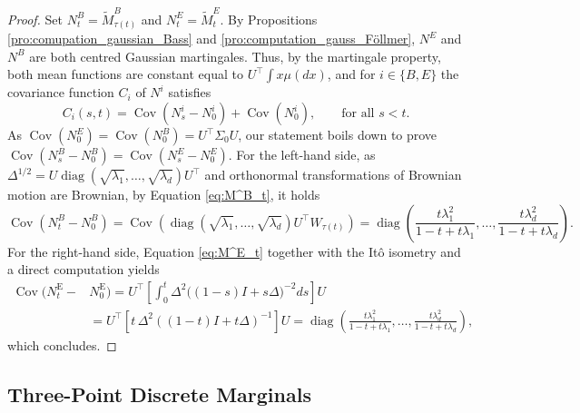\documentclass[reqno, a4paper]{amsart}
\theoremstyle{plain}
\theoremstyle{definition}
\theoremstyle{remark}
\numberwithin{equation}{section}
\numberwithin{theorem}{section}
\DeclareMathOperator{\diag}{diag}
\DeclareMathOperator{\Cov}{Cov}
\begin{document}
	\begin{proof}
		Set $N_t^B= \tilde M_{\tau(t)}^B$ and
		$N_t^E= \tilde M_t^E$. By Propositions \ref{pro:comupation_gaussian_Bass} and \ref{pro:computation_gauss_Föllmer}, $N^E$ and $N^B$ are both centred Gaussian martingales. Thus, by the martingale property, both mean functions are constant 
        equal to $U^\top \int x \mu(dx)$, and for $i \in \{ B,E \}$ the covariance function $C_i$ of $N^i$ satisfies
        $$C_i(s,t) = \Cov(N_s^i - N_0^i) + \Cov(N_0^i), \qquad \text{for all }  s<t.$$
        As $\Cov(N_0^E)=\Cov(N_0^B) = U^\top \Sigma_0 U$, our statement boils down to prove $\Cov(N_s^B - N_0^B) = \Cov(N_s^E - N_0^E)$. For the left-hand side, as $\Delta^{1/2} = U \diag(\sqrt{\lambda_1},\dots, \sqrt{\lambda_d}) U^\top$ and orthonormal transformations of Brownian motion are Brownian, by Equation \eqref{eq:M^B_t}, it holds $$\Cov(N_t^B- N_0^B) = \Cov\left(\diag(\sqrt{\lambda_1},\dots, \sqrt{\lambda_d}) U^\top W_{\tau(t)}\right) = \diag\!\left(
		\frac{t\lambda_1^2}{1-t+t\lambda_1},
		\dots,
		\frac{t\lambda_d^2}{1-t+t\lambda_d}
		\right).$$
        For the right-hand side, Equation \eqref{eq:M^E_t} together with the Itô isometry and a direct computation yields
        \begin{align*}
            \Cov(N_t^{\mathrm E}-&N_0^{\mathrm E}) = U^\top \left[\int_0^t \Delta^2\bigl((1-s)I+s\Delta\bigr)^{-2} ds\right] U\\
            &=
		U^\top\left[t\,\Delta^2\left((1-t)I+t\Delta\right)^{-1}\right]U
		=
		\diag\!\left(
		\frac{t\lambda_1^2}{1-t+t\lambda_1},
		\dots,
		\frac{t\lambda_d^2}{1-t+t\lambda_d}
		\right),
        \end{align*}
        which concludes.
	\end{proof}
	
	\subsection{Three-Point Discrete Marginals}
	
\end{document}
